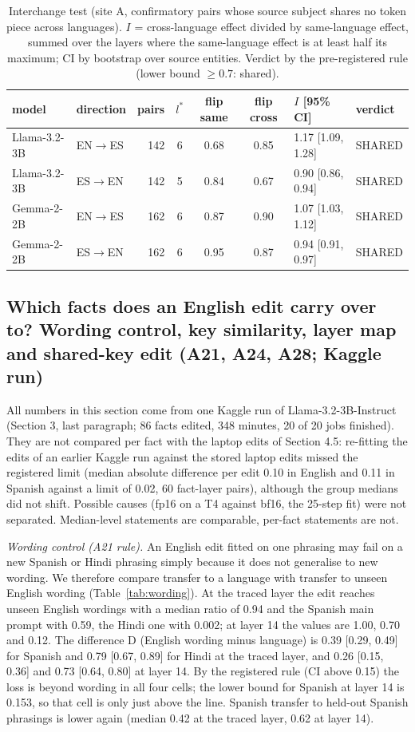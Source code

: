 \documentclass[11pt]{article}
\begin{document}
\begin{table}[t]\centering\small\begin{tabular}{llrcccll}\toprule
model & direction & pairs & $l^*$ & flip same & flip cross & $I$ [95\% CI] & verdict \\\midrule
Llama-3.2-3B & EN$\to$ES & 142 & 6 & 0.68 & 0.85 & 1.17 [1.09, 1.28] & SHARED \\
Llama-3.2-3B & ES$\to$EN & 142 & 5 & 0.84 & 0.67 & 0.90 [0.86, 0.94] & SHARED \\
\addlinespace
Gemma-2-2B & EN$\to$ES & 162 & 6 & 0.87 & 0.90 & 1.07 [1.03, 1.12] & SHARED \\
Gemma-2-2B & ES$\to$EN & 162 & 6 & 0.95 & 0.87 & 0.94 [0.91, 0.97] & SHARED \\
\bottomrule\end{tabular}\caption{Interchange test (site A, confirmatory pairs whose source subject shares no token piece across languages). $I$ = cross-language effect divided by same-language effect, summed over the layers where the same-language effect is at least half its maximum; CI by bootstrap over source entities. Verdict by the pre-registered rule (lower bound $\geq 0.7$: shared).}\label{tab:e2}\end{table}

\subsection{Which facts does an English edit carry over to? Wording control, key similarity, layer map and shared-key edit (A21, A24, A28; Kaggle run)}
All numbers in this section come from one Kaggle run of Llama-3.2-3B-Instruct (Section 3, last paragraph; 86 facts edited, 348 minutes, 20 of 20 jobs finished). They are not compared per fact with the laptop edits of Section 4.5: re-fitting the edits of an earlier Kaggle run against the stored laptop edits missed the registered limit (median absolute difference per edit 0.10 in English and 0.11 in Spanish against a limit of 0.02, 60 fact-layer pairs), although the group medians did not shift. Possible causes (fp16 on a T4 against bf16, the 25-step fit) were not separated. Median-level statements are comparable, per-fact statements are not.

\emph{Wording control (A21 rule).} An English edit fitted on one phrasing may fail on a new Spanish or Hindi phrasing simply because it does not generalise to new wording. We therefore compare transfer to a language with transfer to unseen English wording (Table~\ref{tab:wording}). At the traced layer the edit reaches unseen English wordings with a median ratio of 0.94 and the Spanish main prompt with 0.59, the Hindi one with 0.002; at layer 14 the values are 1.00, 0.70 and 0.12. The difference D (English wording minus language) is 0.39 {[}0.29, 0.49{]} for Spanish and 0.79 {[}0.67, 0.89{]} for Hindi at the traced layer, and 0.26 {[}0.15, 0.36{]} and 0.73 {[}0.64, 0.80{]} at layer 14. By the registered rule (CI above 0.15) the loss is beyond wording in all four cells; the lower bound for Spanish at layer 14 is 0.153, so that cell is only just above the line. Spanish transfer to held-out Spanish phrasings is lower again (median 0.42 at the traced layer, 0.62 at layer 14).
\end{document}
